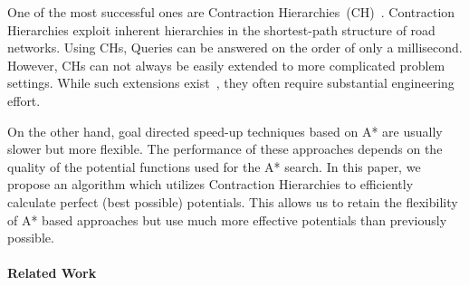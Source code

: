 \documentclass[a4paper,UKenglish,cleveref, autoref]{lipics-v2019}
\begin{document}
One of the most successful ones are Contraction Hierarchies~(CH)~\cite{gssv-erlrn-12}.
Contraction Hierarchies exploit inherent hierarchies in the shortest-path structure of road networks.
Using CHs, Queries can be answered on the order of only a millisecond.
However, CHs can not always be easily extended to more complicated problem settings.
While such extensions exist~\cite{dsw-cch-15,bgsv-mtdtt-13}, they often require substantial engineering effort.

On the other hand, goal directed speed-up techniques based on A* are usually slower but more flexible.
The performance of these approaches depends on the quality of the potential functions used for the A* search.
In this paper, we propose an algorithm which utilizes Contraction Hierarchies to efficiently calculate perfect (best possible) potentials.
This allows us to retain the flexibility of A* based approaches but use much more effective potentials than previously possible.


\paragraph*{Related Work}


\end{document}
